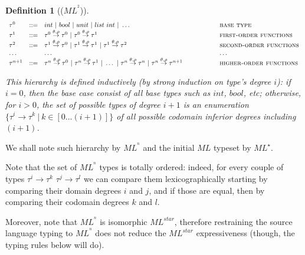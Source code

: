 \documentclass[a4paper,11pt,oneside]{article}
\theoremstyle{plain}
\newtheorem{definition}{Definition}[subsection]
\begin{document}
\begin{definition}[($ML^{^{2}}$)]
\begin{displaymath}
	\begin{array}{lll@{\hspace*{2cm}}l}
	\tau^0 & ::= & int~|~bool~|~unit~|~list~int~|~\dots~ & \textsc{base type}  \\
	\tau^1 & ::= & 
	\tau^0 \stackrel{\theta, \rho}{\rightarrow} \tau^0 ~|~
	\tau^0 \stackrel{\theta, \rho}{\rightarrow} \tau^1 
	& \textsc{first-order functions}\\
	\tau^2 & ::= & 
	\tau^1 \stackrel{\theta, \rho}{\rightarrow} \tau^0 ~|~
	\tau^1 \stackrel{\theta, \rho}{\rightarrow} \tau^1 ~|~
	\tau^1 \stackrel{\theta, \rho}{\rightarrow} \tau^2 
	& \textsc{second-order functions} \\
	\dots & & \dots &  \dots \\
	\tau^{n+1} & ::= & 
	\tau^{n} \stackrel{\theta, \rho}{\rightarrow} \tau^0 ~|~
	\tau^{n} \stackrel{\theta, \rho}{\rightarrow} \tau^1 ~|~ 
	\dots ~|~
	\tau^{n} \stackrel{\theta, \rho}{\rightarrow} \tau^{n} ~|~
	\tau^{n} \stackrel{\theta, \rho}{\rightarrow}\tau^{n+1}
	& \textsc{higher-order functions} \\
	
	\end{array}
\end{displaymath}
\label{MLn-ty-d}

This hierarchy is defined inductively (by strong induction on type's degree $i$): if $i=0$, then the base case consist of all base types such as $int$, $bool$, etc; otherwise, for $i > 0$, the set of possible types of degree $i+1$ is an enumeration  $\{\tau^{i} \rightarrow \tau^{k} ~|~ k \in [ 0 \dots (i+1) ] \}$ of all possible codomain inferior degrees including $(i+1)$. 
\end{definition}

We shall note such hierarchy by $ML^{^{n}}$ and the initial $ML$ typeset by $ML^\star$. 

Note that the set of $ML^{^{n}}$ types is totally ordered: indeed, for every couple of types $\tau^i \rightarrow \tau^k$ $\tau^j \rightarrow \tau^l$ we can compare them lexicographically  starting by comparing their domain degrees $i$ and $j$, and if those are equal, then by comparing their codomain degrees $k$ and $l$. 

Moreover, note that $ML^{^{n}}$ is isomorphic $ML^{star}$, therefore  restraining the source language typing to $ML^{^{n}}$ does not reduce the $ML^{star}$ expressiveness (though, the typing rules below will do).
\end{document}
